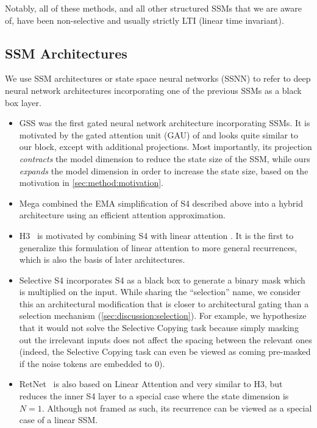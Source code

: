Notably, all of these methods, and all other structured SSMs that we are aware of, have been non-selective and usually strictly LTI (linear time invariant).

\subsection{SSM Architectures}

We use SSM architectures or state space neural networks (SSNN) to refer to deep neural network architectures
incorporating one of the previous SSMs as a black box layer.

\begin{itemize}[leftmargin=*,itemsep=0pt,topsep=0pt]
  \item GSS \citep{mehta2023long} was the first gated neural network architecture incorporating SSMs. It is motivated by the gated attention unit (GAU) of \citet{hua2022transformer} and looks quite similar to our block, except with additional projections. Most importantly, its projection \emph{contracts} the model dimension to reduce the state size of the SSM,
    while ours \emph{expands} the model dimension in order to increase the state size, based on the motivation in \cref{sec:method:motivation}.
  \item Mega \citep{ma2023mega} combined the EMA simplification of S4 described above into a hybrid architecture using an efficient attention approximation.
  \item H3~\citep{dao2023hungry} is motivated by combining S4 with linear attention \citep{katharopoulos2020transformers}. It is the first to generalize this formulation of linear attention to more general recurrences, which is also the basis of later architectures.
  \item Selective S4 \citep{wang2023selective} incorporates S4 as a black box to generate a binary mask which is multiplied on the input.
    While sharing the ``selection'' name, we consider this an architectural modification that is closer to architectural gating than a selection mechanism (\cref{sec:discussion:selection}).
    For example, we hypothesize that it would not solve the Selective Copying task because simply masking out the irrelevant inputs does not affect the spacing between the relevant ones (indeed, the Selective Copying task can even be viewed as coming pre-masked if the noise tokens are embedded to 0).
  \item RetNet~\citep{sun2023retentive} is also based on Linear Attention and very similar to H3, but reduces the inner S4 layer to a special case where the state dimension is $N=1$.
    Although not framed as such, its recurrence can be viewed as a special case of a linear SSM.


\end{itemize}
